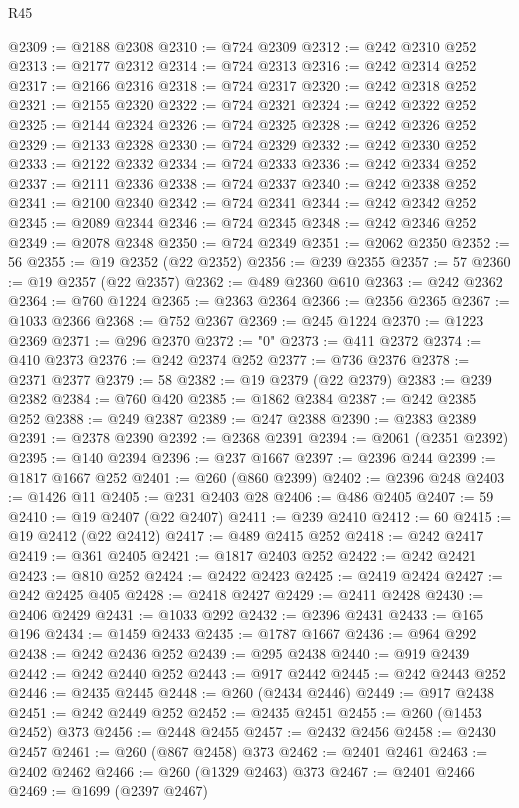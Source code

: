 \begin{lexlean}{R45}
\begin{coremodule}
{@2309 := @2188 @2308
@2310 := @724 @2309
@2312 := @242 @2310 @252
@2313 := @2177 @2312
@2314 := @724 @2313
@2316 := @242 @2314 @252
@2317 := @2166 @2316
@2318 := @724 @2317
@2320 := @242 @2318 @252
@2321 := @2155 @2320
@2322 := @724 @2321
@2324 := @242 @2322 @252
@2325 := @2144 @2324
@2326 := @724 @2325
@2328 := @242 @2326 @252
@2329 := @2133 @2328
@2330 := @724 @2329
@2332 := @242 @2330 @252
@2333 := @2122 @2332
@2334 := @724 @2333
@2336 := @242 @2334 @252
@2337 := @2111 @2336
@2338 := @724 @2337
@2340 := @242 @2338 @252
@2341 := @2100 @2340
@2342 := @724 @2341
@2344 := @242 @2342 @252
@2345 := @2089 @2344
@2346 := @724 @2345
@2348 := @242 @2346 @252
@2349 := @2078 @2348
@2350 := @724 @2349
@2351 := @2062 @2350
@2352 := 56
@2355 := @19 @2352 (@22 @2352)
@2356 := @239 @2355
@2357 := 57
@2360 := @19 @2357 (@22 @2357)
@2362 := @489 @2360 @610
@2363 := @242 @2362
@2364 := @760 @1224
@2365 := @2363 @2364
@2366 := @2356 @2365
@2367 := @1033 @2366
@2368 := @752 @2367
@2369 := @245 @1224
@2370 := @1223 @2369
@2371 := @296 @2370
@2372 := "0"
@2373 := @411 @2372
@2374 := @410 @2373
@2376 := @242 @2374 @252
@2377 := @736 @2376
@2378 := @2371 @2377
@2379 := 58
@2382 := @19 @2379 (@22 @2379)
@2383 := @239 @2382
@2384 := @760 @420
@2385 := @1862 @2384
@2387 := @242 @2385 @252
@2388 := @249 @2387
@2389 := @247 @2388
@2390 := @2383 @2389
@2391 := @2378 @2390
@2392 := @2368 @2391
@2394 := @2061 (@2351 @2392)
@2395 := @140 @2394
@2396 := @237 @1667
@2397 := @2396 @244
@2399 := @1817 @1667 @252
@2401 := @260 (@860 @2399)
@2402 := @2396 @248
@2403 := @1426 @11
@2405 := @231 @2403 @28
@2406 := @486 @2405
@2407 := 59
@2410 := @19 @2407 (@22 @2407)
@2411 := @239 @2410
@2412 := 60
@2415 := @19 @2412 (@22 @2412)
@2417 := @489 @2415 @252
@2418 := @242 @2417
@2419 := @361 @2405
@2421 := @1817 @2403 @252
@2422 := @242 @2421
@2423 := @810 @252
@2424 := @2422 @2423
@2425 := @2419 @2424
@2427 := @242 @2425 @405
@2428 := @2418 @2427
@2429 := @2411 @2428
@2430 := @2406 @2429
@2431 := @1033 @292
@2432 := @2396 @2431
@2433 := @165 @196
@2434 := @1459 @2433
@2435 := @1787 @1667
@2436 := @964 @292
@2438 := @242 @2436 @252
@2439 := @295 @2438
@2440 := @919 @2439
@2442 := @242 @2440 @252
@2443 := @917 @2442
@2445 := @242 @2443 @252
@2446 := @2435 @2445
@2448 := @260 (@2434 @2446)
@2449 := @917 @2438
@2451 := @242 @2449 @252
@2452 := @2435 @2451
@2455 := @260 (@1453 @2452) @373
@2456 := @2448 @2455
@2457 := @2432 @2456
@2458 := @2430 @2457
@2461 := @260 (@867 @2458) @373
@2462 := @2401 @2461
@2463 := @2402 @2462
@2466 := @260 (@1329 @2463) @373
@2467 := @2401 @2466
@2469 := @1699 (@2397 @2467)
}
\end{coremodule}
\end{lexlean}
